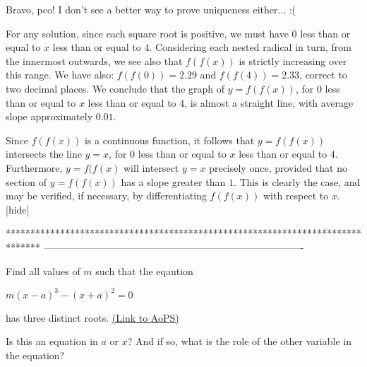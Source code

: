 \begin{solution}
	Bravo, pco! I don't see a better way to prove uniqueness either...  :(
\end{solution}



\begin{solution}

For any solution, since each square root is positive, we must have $0$ less than or equal to $x$ less than or equal to $4$.
Considering each nested radical in turn, from the innermost outwards, we see also that $f(f(x))$ is strictly increasing over this range.
We have also: $f(f(0)) = 2.29$ and $f(f(4)) = 2.33$, correct to two decimal places.
We conclude that the graph of $y = f(f(x))$, for 0 less than or equal to $x$ less than or equal to $4$, is almost a straight line, with average slope approximately $0.01$.

Since $f(f(x))$ is a continuous function, it follows that $y = f(f(x))$ intersects the line $y = x$, for $0$ less than or equal to $x$ less than or equal to $4$.
Furthermore, $y = f(f(x)$ will intersect $y = x$ precisely once, provided that no section of $y = f(f(x))$ has a slope greater than $1$.
This is clearly the case, and may be verified, if necessary, by differentiating $f(f(x))$ with respect to $x$. [\/hide]
\end{solution}
*******************************************************************************
-------------------------------------------------------------------------------

\begin{problem}
	Find all values of $m$ such that the eqaution

$m(x-a)^{3} -(x+a)^{2} =0$

has three distinct roots.
	\flushright \href{https://artofproblemsolving.com/community/c6h483583}{(Link to AoPS)}
\end{problem}



\begin{solution}
	Is this an equation in $a$ or $x$? And if so, what is the role of the other variable in the equation?
\end{solution}



